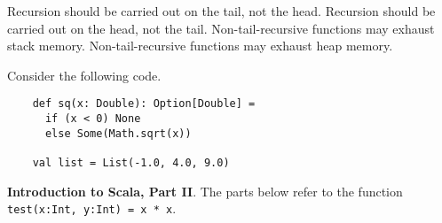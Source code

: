 \begin{questions}
\begin{parts}
    \begin{checkboxes}
      \choice Recursion should be carried out on the tail, not the head.
      \choice Recursion should be carried out on the head, not the tail.
      \CorrectChoice Non-tail-recursive functions may exhaust stack memory.
      \choice Non-tail-recursive functions may exhaust heap memory.
    \end{checkboxes}

  \end{parts}

\vskip1cm

  \question Consider the following code.

  \begin{verbatim}
    def sq(x: Double): Option[Double] =
      if (x < 0) None
      else Some(Math.sqrt(x))

    val list = List(-1.0, 4.0, 9.0)
  \end{verbatim}


  \newpage

  \question \textbf{Introduction to Scala, Part II}. The parts below refer to the function \texttt{test(x:Int, y:Int) = x * x}.


\end{questions}
